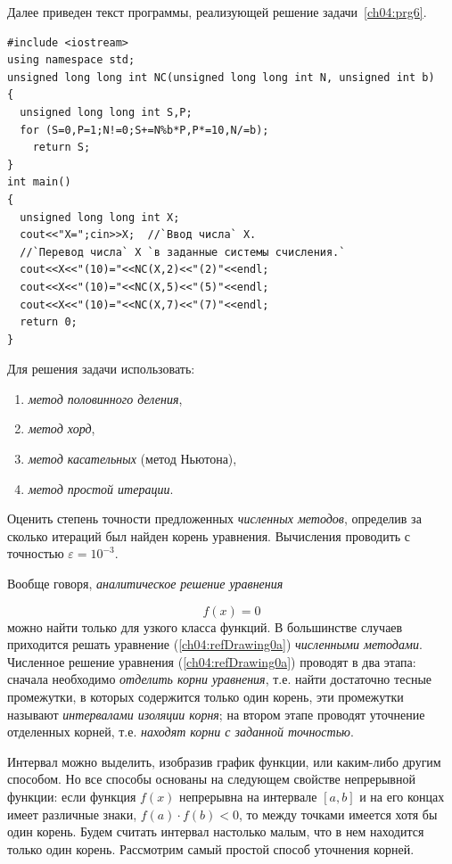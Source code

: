 Далее приведен текст программы, реализующей решение задачи~\ref{ch04:prg6}.

\begin{lstlisting}
#include <iostream>
using namespace std;
unsigned long long int NC(unsigned long long int N, unsigned int b)
{
  unsigned long long int S,P;
  for (S=0,P=1;N!=0;S+=N%b*P,P*=10,N/=b);
    return S;
}
int main()
{
  unsigned long long int X;
  cout<<"X=";cin>>X;  //`Ввод числа` X.
  //`Перевод числа` X `в заданные системы счисления.`
  cout<<X<<"(10)="<<NC(X,2)<<"(2)"<<endl;
  cout<<X<<"(10)="<<NC(X,5)<<"(5)"<<endl;
  cout<<X<<"(10)="<<NC(X,7)<<"(7)"<<endl;
  return 0;
}
\end{lstlisting}


Для
решения задачи использовать:
\begin{enumerate}
\item \emph{метод половинного деления},
\item \emph{метод хорд},
\item \emph{метод касательных} (метод Ньютона),
\item \emph{метод простой итерации}.
\end{enumerate}
Оценить степень точности предложенных \emph{численных методов}, определив за сколько итераций был найден
корень уравнения. Вычисления проводить с точностью  $\varepsilon=10^{-3}$.

Вообще говоря, \emph{аналитическое решение уравнения}

\begin{equation}\label{ch04:refDrawing0a}
f(x)=0
\end{equation}
можно найти только для узкого класса функций. В большинстве случаев приходится решать уравнение (\ref{ch04:refDrawing0a})
\emph{численными методами}. Численное решение уравнения (\ref{ch04:refDrawing0a}) проводят в два этапа: сначала
необходимо \emph{отделить корни уравнения}, т.е. найти достаточно тесные промежутки, в которых содержится
только один корень, эти промежутки называют \emph{интервалами изоляции корня}; на втором этапе проводят
уточнение отделенных корней, т.е. \emph{находят корни с заданной точностью}.

Интервал можно выделить, изобразив график функции, или каким-либо другим способом. Но все способы основаны на следующем
свойстве непрерывной функции: если функция  $f(x)$  непрерывна на интервале  $[a,b]$ и на его концах имеет различные
знаки,  $f(a)\cdot f(b)<0$, то между точками имеется хотя бы один корень. Будем считать интервал настолько малым, что в
нем находится только один корень. Рассмотрим самый простой способ уточнения корней.


